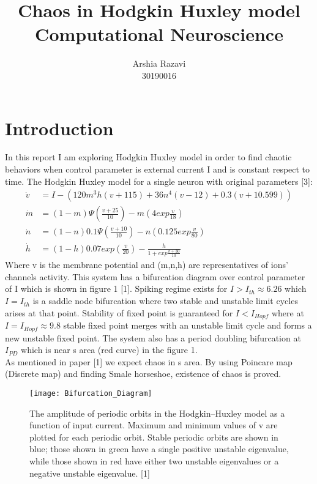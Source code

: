 \documentclass{article}
\title{Chaos in Hodgkin Huxley model\\ Computational Neuroscience}
\author{Arshia Razavi\\30190016}
\begin{document}
	\maketitle
	
	\section{Introduction}
		In this report I am exploring Hodgkin Huxley model in order to find chaotic behaviors when control parameter is external current I and is constant respect to time.
		The Hodgkin Huxley model for a single neuron with original parameters [3]: 
		\begin{align*}
			\dot{v} &= I - (120m^3h(v+115) + 36n^4(v-12) + 0.3(v+10.599))\\
			\dot{m} &= (1-m) \Psi(\frac{v+25}{10}) - m(4exp\frac{v}{18})\\
			\dot{n} &= (1-n)0.1\Psi(\frac{v+10}{10})-n(0.125exp\frac{v}{80})\\
			\dot{h} &= (1-h)0.07exp(\frac{v}{20}) -\frac{h}{1+exp\frac{v+30}{10}}
		\end{align*}
		Where v is the membrane potential and (m,n,h) are representatives of ions' channels activity. This system has a bifurcation diagram over control parameter of I which is shown in figure 1 [1]. Spiking regime exists for $I > I_{th} \approx 6.26$ which $I=I_{th}$ is a saddle node bifurcation where two stable and unstable limit cycles arises at that point. Stability of fixed point is guaranteed for $I < I_{Hopf}$ where at $I = I_{Hopf} \approx 9.8$ stable fixed point merges with an unstable limit cycle and forms a new unstable fixed point. The system also has a period doubling bifurcation at $I_{PD}$ which is near s area (red curve) in the figure 1. \\
		As mentioned in paper [1] we expect chaos in s area. By using Poincare map (Discrete map) and finding Smale horseshoe, existence of chaos is proved. 
		
		\begin{figure}[H]
			\centering
			\texttt{[image: Bifurcation\_Diagram]}
			\caption{The amplitude of periodic orbits in the Hodgkin–Huxley model as a function of input
				current. Maximum and minimum values of v are plotted for each periodic orbit. Stable periodic orbits are
				shown in blue; those shown in green have a single positive unstable eigenvalue, while those shown in red have
				either two unstable eigenvalues or a negative unstable eigenvalue. [1]}
			\label{fig:bifurcationdiagram}
		\end{figure}
		
\end{document}
